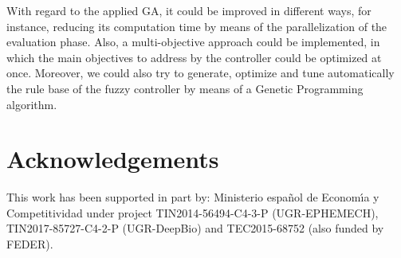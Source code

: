 \documentclass[conference]{IEEEtran}
\begin{document}
With regard to the applied GA, it could be improved in different ways,
for instance, reducing its computation time by means of the
parallelization of the evaluation phase. Also, a multi-objective
approach could be implemented, in which the main objectives to address
by the controller could be optimized at once. 
Moreover, we could also try to generate, optimize and tune
automatically the rule base of the fuzzy controller by means of a
Genetic Programming algorithm.  

\section*{Acknowledgements}

This work has been supported in part by: Ministerio espa\~{n}ol de
Econom\'{\i}a y Competitividad under project TIN2014-56494-C4-3-P
(UGR-EPHEMECH), TIN2017-85727-C4-2-P (UGR-DeepBio) and TEC2015-68752 (also funded by FEDER).



\end{document}

